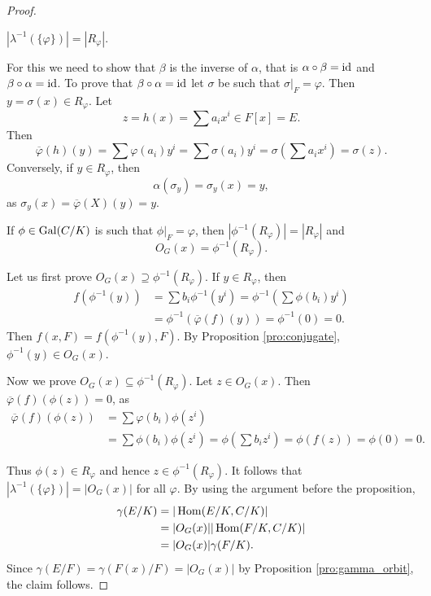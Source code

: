 \begin{proof}
    \begin{claim}
        $|\lambda^{-1}(\{\varphi\})|=|R_\varphi|$. 
    \end{claim}
    
    For this we need to show that $\beta$ is
    the inverse of $\alpha$, that is 
    $\alpha\circ\beta=\operatorname{id}$ and $\beta\circ\alpha=\operatorname{id}$. 
    To prove that $\beta\circ\alpha=\operatorname{id}$ 
    let $\sigma$ be such that $\sigma|_F=\varphi$. 
    Then $y=\sigma(x)\in R_\varphi$. Let
    \[
    z=h(x)=\sum a_ix^i\in F[x]=E.
    \]
    Then  
    \[
    \overline{\varphi}(h)(y)=\sum\varphi(a_i)y^i=\sum\sigma(a_i)y^i
    =\sigma\left(\sum a_ix^i\right)=\sigma(z).
    \]
    Conversely, if $y\in R_\varphi$, then
    \[
    \alpha(\sigma_y)=\sigma_y(x)=y,
    \]
    as $\sigma_y(x)=\overline{\varphi}(X)(y)=y$.
    
    \begin{claim}
        If $\phi\in\operatorname{Gal}(C/K)$ is such that $\phi|_F=\varphi$, then 
        $|\phi^{-1}(R_\varphi)|=|R_{\varphi}|$ and 
        \[
        O_{G}(x)=\phi^{-1}(R_\varphi).
        \]
    \end{claim}

    Let us first prove $O_{G}(x)\supseteq \phi^{-1}(R_\varphi)$.
    If $y\in R_{\varphi}$, 
    then 
    \begin{align*}
    f(\phi^{-1}(y))&=\sum b_i\phi^{-1}(y^i)=\phi^{-1}\left(\sum\phi(b_i)y^i\right)\\
&=\phi^{-1}(\overline{\varphi}(f)(y))=\phi^{-1}(0)=0.
    \end{align*}
    Then $f(x,F)=f(\phi^{-1}(y),F)$. By Proposition \ref{pro:conjugate}, $\phi^{-1}(y)\in O_G(x)$. 
    
    Now we prove $O_{G}(x)\subseteq\phi^{-1}(R_\varphi)$.
    Let $z\in O_{G}(x)$. Then $\overline{\varphi}(f)(\phi(z))=0$, as
    \begin{align*}
    \overline{\varphi}(f)(\phi(z))&=\sum\varphi(b_i)\phi(z^i)\\
    &=\sum\phi(b_i)\phi(z^i)
    =\phi\left(\sum b_iz^i\right)
    =\phi(f(z))=\phi(0)=0.
    \end{align*}
    
    \medskip
    Thus $\phi(z)\in R_{\varphi}$ and hence $z\in\phi^{-1}(R_{\varphi})$. 
    It follows that $|\lambda^{-1}(\{\varphi\})|=|O_{G}(x)|$ for
    all $\varphi$. By using the argument
    before the proposition, 
    \begin{align*}
    \gamma(E/K)&=|\operatorname{Hom}(E/K,C/K)|\\
        &=|O_{G}(x)||\operatorname{Hom}(F/K,C/K)|\\
        &=|O_{G}(x)|\gamma(F/K).
    \end{align*}
    Since $\gamma(E/F)=\gamma(F(x)/F)=|O_{G}(x)|$ by Proposition \ref{pro:gamma_orbit}, the claim follows. 
    

\end{proof}
